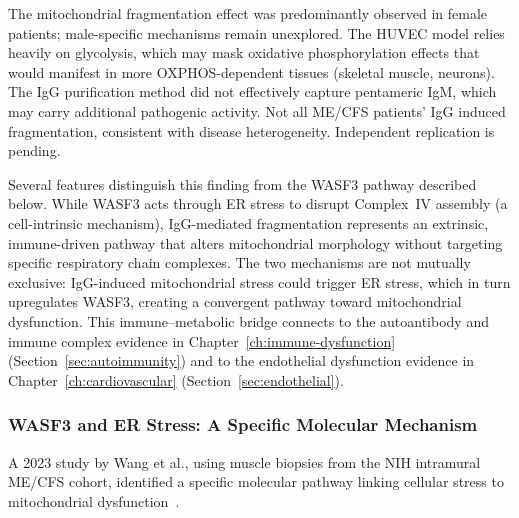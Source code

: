 \begin{warning}
The mitochondrial fragmentation effect was predominantly observed in female patients; male-specific mechanisms remain unexplored. The HUVEC model relies heavily on glycolysis, which may mask oxidative phosphorylation effects that would manifest in more OXPHOS-dependent tissues (skeletal muscle, neurons). The IgG purification method did not effectively capture pentameric IgM, which may carry additional pathogenic activity. Not all ME/CFS patients' IgG induced fragmentation, consistent with disease heterogeneity. Independent replication is pending.
\end{warning}

Several features distinguish this finding from the WASF3 pathway described below. While WASF3 acts through ER stress to disrupt Complex~IV assembly (a cell-intrinsic mechanism), IgG-mediated fragmentation represents an extrinsic, immune-driven pathway that alters mitochondrial morphology without targeting specific respiratory chain complexes. The two mechanisms are not mutually exclusive: IgG-induced mitochondrial stress could trigger ER stress, which in turn upregulates WASF3, creating a convergent pathway toward mitochondrial dysfunction. This immune--metabolic bridge connects to the autoantibody and immune complex evidence in Chapter~\ref{ch:immune-dysfunction} (Section~\ref{sec:autoimmunity}) and to the endothelial dysfunction evidence in Chapter~\ref{ch:cardiovascular} (Section~\ref{sec:endothelial}).

\subsubsection{WASF3 and ER Stress: A Specific Molecular Mechanism}

A 2023 study by Wang et al., using muscle biopsies from the NIH intramural ME/CFS cohort, identified a specific molecular pathway linking cellular stress to mitochondrial dysfunction~\cite{wang2023wasf3}.

